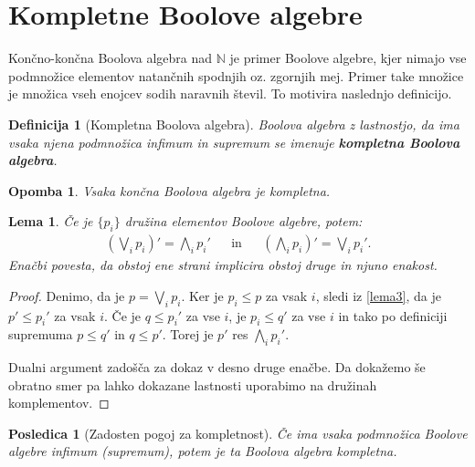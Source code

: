 \documentclass{amsart}
\newcommand{\NN}{\mathbb{N}}
\newtheorem{lema}[izrek]{Lema}
\newtheorem{posledica}[izrek]{Posledica}
\newtheorem{definicija}[izrek]{Definicija}
\newtheorem{opomba}[izrek]{Opomba}
\begin{document}
\section{Kompletne Boolove algebre}

Končno-končna Boolova algebra nad \(\NN\) je primer Boolove algebre, kjer nimajo vse podmnožice elementov
natančnih spodnjih oz. zgornjih mej. Primer take množice je množica vseh enojcev sodih naravnih števil. To motivira naslednjo definicijo.

\begin{definicija}[Kompletna Boolova algebra]
    Boolova algebra z lastnostjo, da ima vsaka njena podmnožica infimum in supremum se imenuje {\bf kompletna
    Boolova algebra}.
\end{definicija}


\begin{opomba}
    Vsaka končna Boolova algebra je kompletna.
\end{opomba}

\begin{lema}
    Če je \(\{p_i\}\) družina elementov Boolove algebre, potem:
    \begin{align*}
        \left(\bigvee_{i} p_i\right)' = \bigwedge_{i} p_i' &&\text{in} && \left(\bigwedge_{i} p_i\right)' = \bigvee_{i} p_i'.
    \end{align*}
    Enačbi povesta, da obstoj ene strani implicira obstoj druge in njuno enakost.
\end{lema}

\begin{proof}
    Denimo, da je \(p = \bigvee_{i} p_i\). Ker je \(p_i \leq p\) za vsak $i$, sledi iz \ref{lema3}, da je \(p' \leq p_i'\) za vsak $i$.
    Če je \(q \leq p_i'\) za vse $i$, je \(p_i \leq q'\) za vse $i$ in tako po definiciji supremuma \(p \leq q'\) in \(q \leq p'\). 
    Torej je $p'$ res \(\bigwedge_{i} p_i'\).

    Dualni argument zadošča za dokaz v desno druge enačbe. Da dokažemo še obratno smer pa lahko dokazane lastnosti uporabimo na družinah komplementov.

\end{proof}

\begin{posledica}[Zadosten pogoj za kompletnost]
    Če ima vsaka podmnožica Boolove algebre infimum (supremum), potem je ta Boolova algebra kompletna.
\end{posledica}

    
\end{document}
